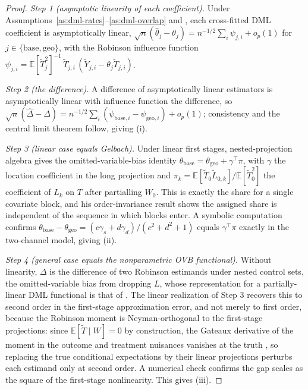 \begin{proof}
\emph{Step 1 (asymptotic linearity of each coefficient).} Under
Assumptions~\ref{as:dml-rates}--\ref{as:dml-overlap} and
\citet[Theorems~3.1--3.2]{chernozhukov2018double}, each cross-fitted DML coefficient
is asymptotically linear, $\sqrt n(\hat\theta_j-\theta_j)=n^{-1/2}\sum_i\psi_{j,i}+
o_p(1)$ for $j\in\{\mathrm{base},\mathrm{geo}\}$, with the Robinson influence function
$\psi_{j,i}=\mathbb{E}[\tilde T_j^{2}]^{-1}\,\tilde T_{j,i}\,(\tilde Y_{j,i}-\theta_j
\tilde T_{j,i})$.

\emph{Step 2 (the difference).} A difference of asymptotically linear estimators is
asymptotically linear with influence function the difference, so $\sqrt
n(\hat\Delta-\Delta)=n^{-1/2}\sum_i(\psi_{\mathrm{base},i}-\psi_{\mathrm{geo},i})+
o_p(1)$; consistency and the central limit theorem follow, giving (i).

\emph{Step 3 (linear case equals Gelbach).} Under linear first stages, nested-projection
algebra gives the omitted-variable-bias identity $\theta_{\mathrm{base}}=
\theta_{\mathrm{geo}}+\gamma^{\top}\pi$, with $\gamma$ the location coefficient in the
long projection and $\pi_k=\mathbb{E}[\tilde T_0\tilde
L_{0,k}]/\mathbb{E}[\tilde T_0^{2}]$ the coefficient of $L_k$ on $T$ after partialling
$W_0$. This is exactly the \citet{gelbach2016covariates} share for a single covariate
block, and his order-invariance result shows the assigned share is independent of the
sequence in which blocks enter. A symbolic computation confirms
$\theta_{\mathrm{base}}-\theta_{\mathrm{geo}}=(c\gamma_s+d\gamma_d)/(c^{2}+d^{2}+1)$
equals $\gamma^{\top}\pi$ exactly in the two-channel model, giving (ii).

\emph{Step 4 (general case equals the nonparametric OVB functional).} Without
linearity, $\Delta$ is the difference of two Robinson estimands under nested control
sets, the omitted-variable bias from dropping $L$, whose representation for a
partially-linear DML functional is that of \citet{chernozhukov2022long}. The linear
realization of Step 3 recovers this to second order in the first-stage approximation
error, and not merely to first order, because the Robinson moment is Neyman-orthogonal
to the first-stage projections: since $\mathbb{E}[\tilde T\mid W]=0$ by construction,
the Gateaux derivative of the moment in the outcome and treatment nuisances vanishes
at the truth \citep{chernozhukov2018double}, so replacing the true conditional
expectations by their linear projections perturbs each estimand only at second order.
A numerical check confirms the gap scales as the square of the first-stage
nonlinearity. This gives (iii).
\end{proof}
